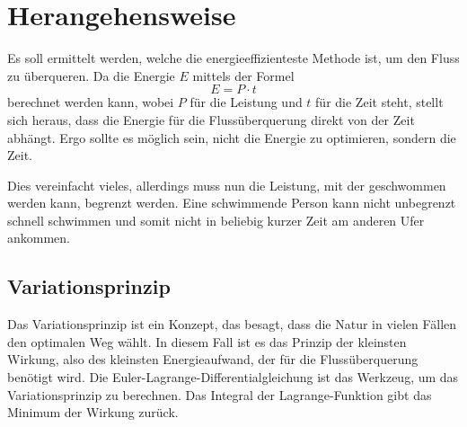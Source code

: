 %
%
%
%
\section{Herangehensweise\label{schwimmen:section:teil0}}

Es soll ermittelt werden, welche die energieeffizienteste Methode ist, um den Fluss zu überqueren. Da die Energie \(E\) mittels der Formel \[E = P \cdot t\] berechnet werden kann, wobei \(P\) für die Leistung und \(t\) für die Zeit steht, stellt sich heraus, dass die Energie für die Flussüberquerung direkt von der Zeit abhängt. Ergo sollte es möglich sein, nicht die Energie zu optimieren, sondern die Zeit.

Dies vereinfacht vieles, allerdings muss nun die Leistung, mit der geschwommen werden kann, begrenzt werden. Eine schwimmende Person kann nicht unbegrenzt schnell schwimmen und somit nicht in beliebig kurzer Zeit am anderen Ufer ankommen.

\subsection{Variationsprinzip}
Das Variationsprinzip ist ein Konzept, das besagt, dass die Natur in vielen Fällen den optimalen Weg wählt. In diesem Fall ist es das Prinzip der kleinsten Wirkung, also des kleinsten Energieaufwand, der für die Flussüberquerung benötigt wird. Die Euler-Lagrange-Differentialgleichung ist das Werkzeug, um das Variationsprinzip zu berechnen. Das Integral der Lagrange-Funktion gibt das Minimum der Wirkung zurück.














